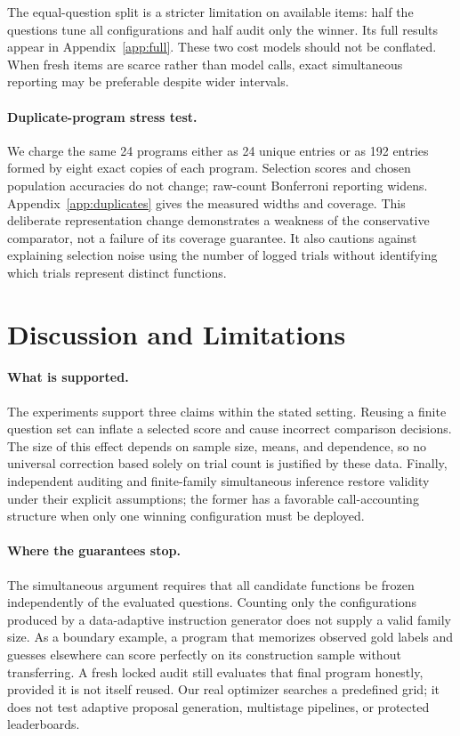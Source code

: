 \documentclass{article}
\begin{document}
The equal-question split is a stricter limitation on available items: half the questions tune all configurations and half audit only the winner. Its full results appear in Appendix~\ref{app:full}. These two cost models should not be conflated. When fresh items are scarce rather than model calls, exact simultaneous reporting may be preferable despite wider intervals.

\paragraph{Duplicate-program stress test.}
We charge the same 24 programs either as 24 unique entries or as 192 entries formed by eight exact copies of each program. Selection scores and chosen population accuracies do not change; raw-count Bonferroni reporting widens. Appendix~\ref{app:duplicates} gives the measured widths and coverage. This deliberate representation change demonstrates a weakness of the conservative comparator, not a failure of its coverage guarantee. It also cautions against explaining selection noise using the number of logged trials without identifying which trials represent distinct functions.

\section{Discussion and Limitations}
\paragraph{What is supported.}
The experiments support three claims within the stated setting. Reusing a finite question set can inflate a selected score and cause incorrect comparison decisions. The size of this effect depends on sample size, means, and dependence, so no universal correction based solely on trial count is justified by these data. Finally, independent auditing and finite-family simultaneous inference restore validity under their explicit assumptions; the former has a favorable call-accounting structure when only one winning configuration must be deployed.

\paragraph{Where the guarantees stop.}
The simultaneous argument requires that all candidate functions be frozen independently of the evaluated questions. Counting only the configurations produced by a data-adaptive instruction generator does not supply a valid family size. As a boundary example, a program that memorizes observed gold labels and guesses elsewhere can score perfectly on its construction sample without transferring. A fresh locked audit still evaluates that final program honestly, provided it is not itself reused. Our real optimizer searches a predefined grid; it does not test adaptive proposal generation, multistage pipelines, or protected leaderboards.
\end{document}

